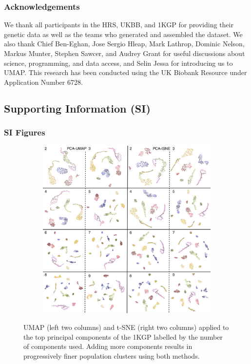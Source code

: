 \documentclass[12pt]{pnas-new}
\newcommand{\beginsupplement}{%
        \setcounter{table}{0}
        \renewcommand{\thetable}{S\arabic{table}}%
        \setcounter{figure}{0}
        \renewcommand{\thefigure}{S\arabic{figure}}%
     }
\begin{document}
\subsubsection*{Acknowledgements}
We thank all participants in the HRS, UKBB, and 1KGP for providing their genetic data as well as the teams who generated and assembled the dataset. We also thank Chief Ben-Eghan, Jose Sergio Hleap, Mark Lathrop, Dominic Nelson, Markus Munter, Stephen Sawcer, and Audrey Grant for useful discussions about science, programming, and data access, and Selin Jessa for introducing us to UMAP. This research has been conducted using the UK Biobank Resource under Application Number 6728.



\newpage

\beginsupplement
\subsection*{Supporting Information (SI)}
\subsubsection*{SI Figures}
\begin{figure}
    \centering
    \begin{subfigure}{\textwidth}
    \includegraphics[width=\textwidth]{images/megamontage_PC2_9.pdf}
    \end{subfigure}
    \caption{UMAP (left two columns) and t-SNE (right two columns) applied to the top principal components of the 1KGP labelled by the number of components used. Adding more components results in progressively finer population clusters using both methods.}
    \label{fig:supp_megamontage_pc2_9}  
\end{figure}
\end{document}
